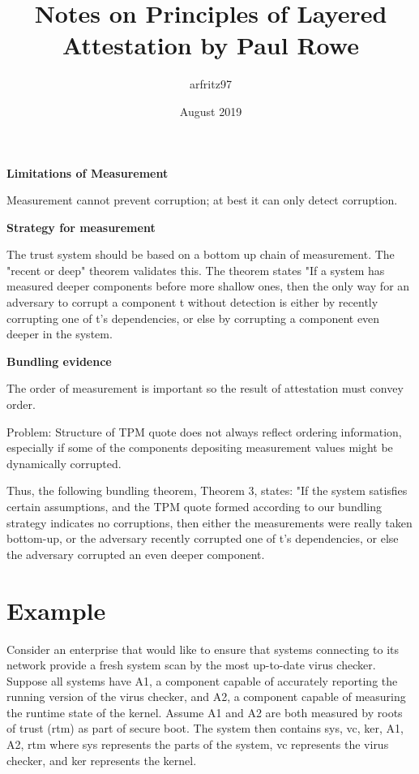 \documentclass{article}
\title{Notes on Principles of Layered Attestation by Paul Rowe}
\author{arfritz97 }
\date{August 2019}
\begin{document}
\textbf {Limitations of Measurement}

Measurement cannot prevent corruption; at best it can only detect corruption.

\textbf {Strategy for measurement}

The trust system should be based on a bottom up chain of measurement. The "recent or deep" theorem validates this. The theorem states "If a system has measured deeper components before more shallow ones, then the only way for an adversary to corrupt a component t without detection is either by recently corrupting one of t's dependencies, or else by corrupting a component even deeper in the system. 

\textbf {Bundling evidence}

The order of measurement is important so the result of attestation must convey order. 

Problem: Structure of TPM quote does not always reflect ordering information, especially if some of the components depositing measurement values might be dynamically corrupted. 

Thus, the following bundling theorem, Theorem 3, states: "If the system satisfies certain assumptions, and the TPM quote formed according to our bundling strategy indicates no corruptions, then either the measurements were really taken bottom-up, or the adversary recently corrupted one of t's dependencies, or else the adversary corrupted an even deeper component. 

\section {Example}

Consider an enterprise that would like to ensure that systems connecting to its network provide a fresh system scan by the most up-to-date virus checker. Suppose all systems have A1, a component capable of accurately reporting the running version of the virus checker, and A2, a component capable of measuring the runtime state of the kernel. Assume A1 and A2 are both measured by roots of trust (rtm) as part of secure boot. The system then contains {sys, vc, ker, A1, A2, rtm} where sys represents the parts of the system, vc represents the virus checker, and ker represents the kernel. 
\end{document}
